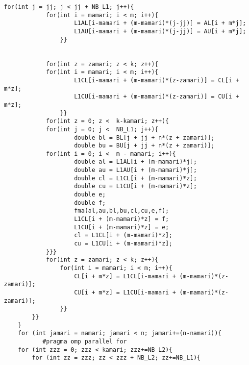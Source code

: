 \documentclass[11pt,a4paper]{jsreport}
\theoremstyle{definition}
\begin{document}
\begin{lstlisting}[caption = 本研究で使用したプログラム]
            for(int j = jj; j < jj + NB_L1; j++){
            for(int i = mamari; i < m; i++){
                    L1AL[i-mamari + (m-mamari)*(j-jj)] = AL[i + m*j];
                    L1AU[i-mamari + (m-mamari)*(j-jj)] = AU[i + m*j];
                }}


            for(int z = zamari; z < k; z++){
            for(int i = mamari; i < m; i++){
                    L1CL[i-mamari + (m-mamari)*(z-zamari)] = CL[i + m*z];
                    L1CU[i-mamari + (m-mamari)*(z-zamari)] = CU[i + m*z];
                }}
            for(int z = 0; z <  k-kamari; z++){
            for(int j = 0; j <  NB_L1; j++){
                    double bl = BL[j + jj + n*(z + zamari)];
                    double bu = BU[j + jj + n*(z + zamari)];
            for(int i = 0; i <  m - mamari; i++){
                    double al = L1AL[i + (m-mamari)*j];
                    double au = L1AU[i + (m-mamari)*j];
                    double cl = L1CL[i + (m-mamari)*z];
                    double cu = L1CU[i + (m-mamari)*z];
                    double e;
                    double f;
                    fma(al,au,bl,bu,cl,cu,e,f);
                    L1CL[i + (m-mamari)*z] = f;
                    L1CU[i + (m-mamari)*z] = e;
                    cl = L1CL[i + (m-mamari)*z];
                    cu = L1CU[i + (m-mamari)*z];
            }}}
            for(int z = zamari; z < k; z++){
                for(int i = mamari; i < m; i++){
                    CL[i + m*z] = L1CL[i-mamari + (m-mamari)*(z-zamari)];
                    CU[i + m*z] = L1CU[i-mamari + (m-mamari)*(z-zamari)];
                }}
        }}
    }
    for (int jamari = namari; jamari < n; jamari+=(n-namari)){
           #pragma omp parallel for
    for (int zzz = 0; zzz < kamari; zzz+=NB_L2){
        for (int zz = zzz; zz < zzz + NB_L2; zz+=NB_L1){



\end{lstlisting}
\end{document}
